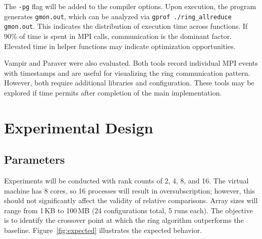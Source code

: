 \documentclass[12pt,a4paper]{article}
\begin{document}
The \texttt{-pg} flag will be added to the compiler options. Upon execution, the program generates \texttt{gmon.out}, which can be analyzed via \texttt{gprof ./ring\_allreduce gmon.out}. This indicates the distribution of execution time across functions. If 90\% of time is spent in MPI calls, communication is the dominant factor. Elevated time in helper functions may indicate optimization opportunities.

Vampir and Paraver were also evaluated. Both tools record individual MPI events with timestamps and are useful for visualizing the ring communication pattern. However, both require additional libraries and configuration. These tools may be explored if time permits after completion of the main implementation.

\section{Experimental Design}

\subsection{Parameters}

Experiments will be conducted with rank counts of 2, 4, 8, and 16. The virtual machine has 8 cores, so 16 processes will result in oversubscription; however, this should not significantly affect the validity of relative comparisons. Array sizes will range from 1\,KB to 100\,MB (24 configurations total, 5 runs each). The objective is to identify the crossover point at which the ring algorithm outperforms the baseline. Figure~\ref{fig:expected} illustrates the expected behavior.
\end{document}
